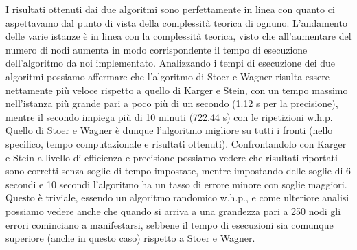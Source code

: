 I risultati ottenuti dai due algoritmi sono perfettamente in linea con quanto ci aspettavamo dal punto di vista della complessità teorica di ognuno. L'andamento delle varie istanze è in linea con la complessità teorica, visto che all'aumentare del numero di nodi aumenta in modo corrispondente il tempo di esecuzione dell'algoritmo da noi implementato. 
Analizzando i tempi di esecuzione dei due algoritmi possiamo affermare che l'algoritmo di Stoer e Wagner risulta essere nettamente più veloce rispetto a quello di Karger e Stein, con un tempo massimo nell'istanza più grande pari a poco più di un secondo (1.12 s per la precisione), mentre il secondo impiega più di 10 minuti (722.44 s) con le ripetizioni w.h.p. Quello di Stoer e Wagner è dunque l'algoritmo migliore su tutti i fronti (nello specifico, tempo computazionale e risultati ottenuti). Confrontandolo con Karger e Stein a livello di efficienza e precisione possiamo vedere che risultati riportati sono corretti senza soglie di tempo impostate, mentre impostando delle soglie di 6 secondi e 10 secondi l'algoritmo ha un tasso di errore minore con soglie maggiori. Questo è triviale, essendo un algoritmo randomico w.h.p., e come ulteriore analisi possiamo vedere anche che quando si arriva a una grandezza pari a 250 nodi gli errori cominciano a manifestarsi, sebbene il tempo di esecuzioni sia comunque superiore (anche in questo caso) rispetto a Stoer e Wagner. 
